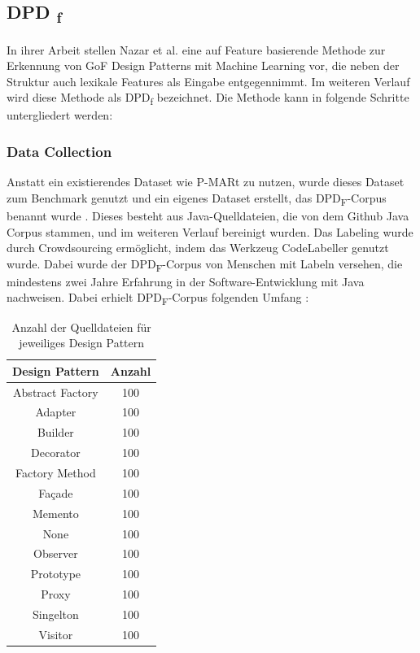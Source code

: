 \documentclass[conference]{IEEEtran}
\begin{document}
\newpage

\subsection{DPD \textsubscript{f}}

In ihrer Arbeit stellen Nazar et al. \cite{NAZAR2022111179} eine auf Feature basierende Methode zur Erkennung von GoF Design Patterns mit Machine Learning vor, die neben der Struktur auch lexikale Features als Eingabe entgegennimmt. Im weiteren Verlauf wird diese Methode als DPD\textsubscript{f} bezeichnet.
Die Methode kann in folgende Schritte untergliedert werden:

\subsubsection*{Data Collection}
Anstatt ein existierendes Dataset wie P-MARt\cite{pmart} zu nutzen, wurde dieses Dataset zum Benchmark genutzt und ein eigenes Dataset erstellt, das DPD\textsubscript{F}-Corpus benannt wurde \cite[p. 4]{NAZAR2022111179}.
Dieses besteht aus Java-Quelldateien, die von dem Github Java Corpus stammen, und im weiteren Verlauf bereinigt wurden.
Das Labeling wurde durch Crowdsourcing ermöglicht, indem das Werkzeug CodeLabeller genutzt wurde. Dabei wurde der DPD\textsubscript{F}-Corpus von Menschen mit Labeln versehen, die mindestens zwei Jahre Erfahrung in der Software-Entwicklung mit Java nachweisen.
Dabei erhielt DPD\textsubscript{F}-Corpus folgenden Umfang \cite[p. 4]{NAZAR2022111179}:

\begin{table}[h]
    \caption{Anzahl der Quelldateien für jeweiliges Design Pattern}
    \label{table:5}
    \centering
    \begin{tabular}{|c|c|}
        \hline
        Design Pattern   & Anzahl \\
        \hline
        Abstract Factory & 100    \\
        \hline
        Adapter          & 100    \\
        \hline
        Builder          & 100    \\
        \hline
        Decorator        & 100    \\
        \hline
        Factory Method   & 100    \\
        \hline
        Façade           & 100    \\
        \hline
        Memento          & 100    \\
        \hline
        None             & 100    \\
        \hline
        Observer         & 100    \\
        \hline
        Prototype        & 100    \\
        \hline
        Proxy            & 100    \\
        \hline
        Singelton        & 100    \\
        \hline
        Visitor          & 100    \\
        \hline
    \end{tabular}
\end{table}
\end{document}
